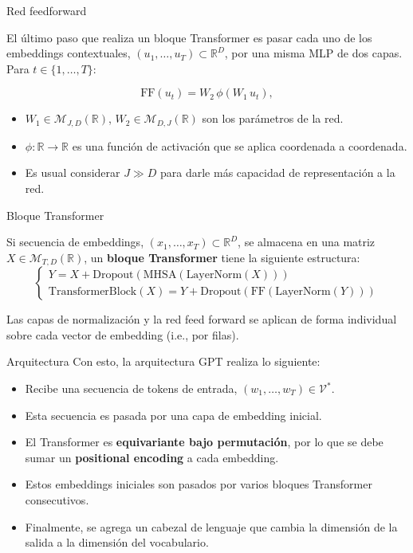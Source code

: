 \documentclass{beamer}
\newcommand{\R}{\mathbb{R}}
\begin{document}
\begin{frame}{Red feedforward}

El último paso que realiza un bloque Transformer es pasar cada uno de los embeddings contextuales, $(u_1,\ldots,u_T)\subset\R^D$, por una misma MLP de dos capas. Para $t\in\{1,\ldots,T\}$:

\begin{equation*}
    \text{FF}(u_t)=W_2\,\phi\left(W_1\,u_t\right),
\end{equation*}

\begin{itemize}
    \item $W_1\in\mathcal{M}_{J,D}(\R)$, $W_2\in\mathcal{M}_{D,J}(\R)$ son los parámetros de la red.
    \item  $\phi:\R\to\R$ es una función de activación que se aplica coordenada a coordenada.
    \item Es usual considerar $J\gg D$ para darle más capacidad de representación a la red.
\end{itemize}


\end{frame}

\begin{frame}{Bloque Transformer}

    Si secuencia de embeddings, $(x_1,\ldots,x_T)\subset\R^D$, se almacena en una matriz $X\in\mathcal{M}_{T,D}(\R)$, un \textbf{bloque Transformer} tiene la siguiente estructura:
    \begin{equation*}
        \begin{cases}
Y=X+\text{Dropout}(\text{MHSA}(\text{LayerNorm}(X)))\\
\text{TransformerBlock}(X) = Y + \text{Dropout}(\text{FF}(\text{LayerNorm}(Y)))
\end{cases}
    \end{equation*}

    Las capas de normalización y la red feed forward se aplican de forma individual sobre cada vector de embedding (i.e., por filas).

\end{frame}

\begin{frame}{Arquitectura}
        Con esto, la arquitectura GPT realiza lo siguiente:

    \begin{itemize}
        \item Recibe una secuencia de tokens de entrada, $(w_1,\ldots,w_T)\in\mathcal{V}^*$.
        \item Esta secuencia es pasada por una capa de embedding inicial.
        \item El Transformer es \textbf{equivariante bajo permutación}, por lo que se debe sumar un \textbf{positional encoding} a cada embedding.
        \item Estos embeddings iniciales son pasados por varios bloques Transformer consecutivos.
        \item Finalmente, se agrega un cabezal de lenguaje que cambia la dimensión de la salida a la dimensión del vocabulario.
    \end{itemize}
\end{frame}
\end{document}
